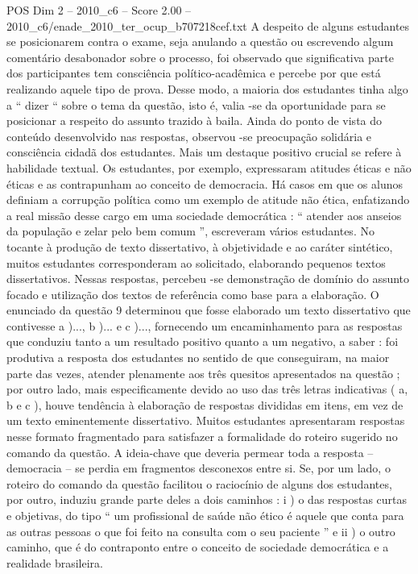 \begin{textsample}{POS Dim 2 – 2010\_c6 – Score 2.00 – 2010\_c6/enade\_2010\_ter\_ocup\_b707218cef.txt}
A despeito de alguns estudantes se posicionarem contra o exame, seja anulando a questão ou escrevendo algum comentário desabonador sobre o processo, foi observado que significativa parte dos participantes tem consciência político-acadêmica e percebe por que está realizando aquele tipo de prova.
Desse modo, a maioria dos estudantes tinha algo a “ dizer “ sobre o tema da questão, isto é, valia -se da oportunidade para se posicionar a respeito do assunto trazido à baila.
Ainda do ponto de vista do conteúdo desenvolvido nas respostas, observou -se preocupação solidária e consciência cidadã dos estudantes.
Mais um destaque positivo crucial se refere à habilidade textual.
Os estudantes, por exemplo, expressaram atitudes éticas e não éticas e as contrapunham ao conceito de democracia.
Há casos em que os alunos definiam a corrupção política como um exemplo de atitude não ética, enfatizando a real missão desse cargo em uma sociedade democrática : “ atender aos anseios da população e zelar pelo bem comum ”, escreveram vários estudantes.
No tocante à produção de texto dissertativo, à objetividade e ao caráter sintético, muitos estudantes corresponderam ao solicitado, elaborando pequenos textos dissertativos.
Nessas respostas, percebeu -se demonstração de domínio do assunto focado e utilização dos textos de referência como base para a elaboração.
O enunciado da questão 9 determinou que fosse elaborado um texto dissertativo que contivesse a )..., b )... e c )..., fornecendo um encaminhamento para as respostas que conduziu tanto a um resultado positivo quanto a um negativo, a saber : foi produtiva a resposta dos estudantes no sentido de que conseguiram, na maior parte das vezes, atender plenamente aos três quesitos apresentados na questão ; por outro lado, mais especificamente devido ao uso das três letras indicativas ( a, b e c ), houve tendência à elaboração de respostas divididas em itens, em vez de um texto eminentemente dissertativo.
Muitos estudantes apresentaram respostas nesse formato fragmentado para satisfazer a formalidade do roteiro sugerido no comando da questão.
A ideia-chave que deveria permear toda a resposta – democracia – se perdia em fragmentos desconexos entre si.
Se, por um lado, o roteiro do comando da questão facilitou o raciocínio de alguns dos estudantes, por outro, induziu grande parte deles a dois caminhos : i ) o das respostas curtas e objetivas, do tipo “ um profissional de saúde não ético é aquele que conta para as outras pessoas o que foi feito na consulta com o seu paciente ” e ii ) o outro caminho, que é do contraponto entre o conceito de sociedade democrática e a realidade brasileira.

\end{textsample}
